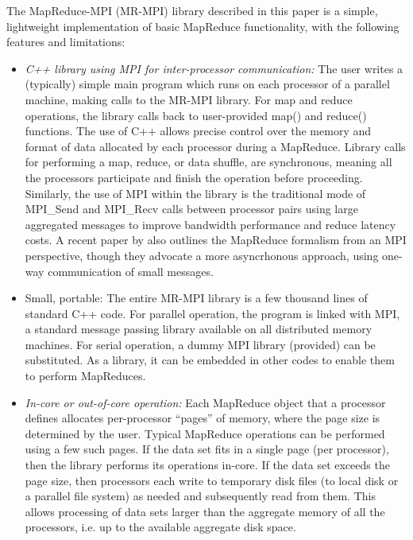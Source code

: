 The MapReduce-MPI (MR-MPI) library described in this paper is a
simple, lightweight implementation of basic MapReduce functionality,
with the following features and limitations:

\begin{itemize}

\item {\it C++ library using MPI for inter-processor communication:}
The user writes a (typically) simple main program which runs on each
processor of a parallel machine, making calls to the MR-MPI library.
For map and reduce operations, the library calls back to user-provided
map() and reduce() functions.  The use of C++ allows precise control
over the memory and format of data allocated by each processor during
a MapReduce.  Library calls for performing a map, reduce, or data
shuffle, are synchronous, meaning all the processors participate and
finish the operation before proceeding.  Similarly, the use of MPI
within the library is the traditional mode of MPI\_Send and
MPI\_Recv calls between processor pairs using large aggregated
messages to improve bandwidth performance and reduce latency costs.  A
recent paper by \cite{Dongarra} also outlines the MapReduce formalism
from an MPI perspective, though they advocate a more asyncrhonous
approach, using one-way communication of small messages.

\item {Small, portable:} The entire MR-MPI library is a few thousand
lines of standard C++ code.  For parallel operation, the program is
linked with MPI, a standard message passing library available on all
distributed memory machines.  For serial operation, a dummy MPI
library (provided) can be substituted.  As a library, it can be
embedded in other codes \cite{Titan,TitanURL} to enable them to
perform MapReduces.

\item {\it In-core or out-of-core operation:} Each MapReduce object that a
processor defines allocates per-processor ``pages'' of memory, where
the page size is determined by the user.  Typical MapReduce operations
can be performed using a few such pages.  If the data set fits in a
single page (per processor), then the library performs its operations
in-core.  If the data set exceeds the page size, then processors each
write to temporary disk files (to local disk or a parallel file
system) as needed and subsequently read from them.  This allows
processing of data sets larger than the aggregate memory of all the
processors, i.e. up to the available aggregate disk space.


\end{itemize}
